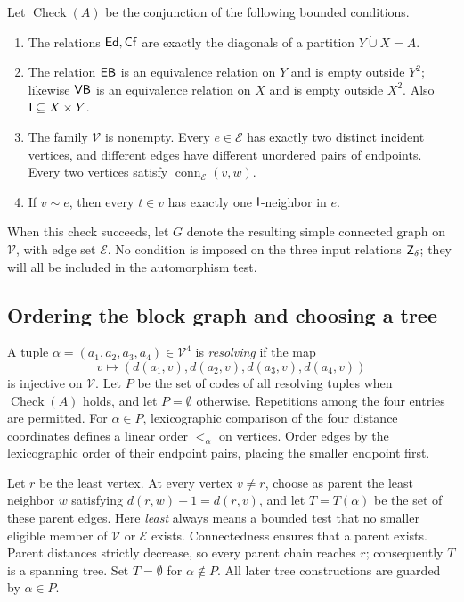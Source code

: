 Let \(\operatorname{Check}(A)\) be the conjunction of the following
bounded conditions.
\begin{enumerate}[label=(\roman*)]
 \item The relations \(\mathsf{Ed},\mathsf{Cf}\) are exactly the diagonals of a
       partition \(Y\mathbin{\dot\cup}X=A\).
 \item The relation \(\mathsf{EB}\) is an equivalence relation on \(Y\) and
       is empty outside \(Y^2\); likewise \(\mathsf{VB}\) is an equivalence
       relation on \(X\) and is empty outside \(X^2\).
       Also \(\mathsf I\subseteq X\times Y\).
 \item The family \(\mathcal V\) is nonempty. Every \(e\in\mathcal E\)
       has exactly two distinct incident vertices, and different
       edges have different unordered pairs of endpoints.
       Every two vertices satisfy
       \(\operatorname{conn}_{\mathcal E}(v,w)\).
 \item If \(v\sim e\), then every \(t\in v\) has exactly one
       \(\mathsf I\)-neighbor in \(e\).
\end{enumerate}
When this check succeeds, let \(G\) denote the resulting simple connected
graph on \(\mathcal V\), with edge set \(\mathcal E\). No condition is
imposed on the three input relations \(\mathsf Z_\delta\); they will all be
included in the automorphism test.

\subsection{Ordering the block graph and choosing a tree}

A tuple \(\alpha=(a_1,a_2,a_3,a_4)\in\mathcal V^4\) is
\emph{resolving} if the map
\[
 v\longmapsto
 (d(a_1,v),d(a_2,v),d(a_3,v),d(a_4,v))
\]
is injective on \(\mathcal V\). Let \(P\) be the set of codes of all
resolving tuples when \(\operatorname{Check}(A)\) holds, and let
\(P=\emptyset\) otherwise. Repetitions among the four entries are
permitted. For \(\alpha\in P\), lexicographic comparison of the four
distance coordinates defines a linear order \(<_\alpha\) on vertices.
Order edges by the lexicographic order of their endpoint pairs, placing
the smaller endpoint first.

Let \(r\) be the least vertex. At every vertex \(v\ne r\), choose as
parent the least neighbor \(w\) satisfying
\(d(r,w)+1=d(r,v)\), and let \(T=T(\alpha)\) be the set of these parent
edges. Here \emph{least} always means a bounded test that no smaller
eligible member of \(\mathcal V\) or \(\mathcal E\) exists. Connectedness
ensures that a parent exists. Parent distances strictly decrease, so
every parent chain reaches \(r\); consequently \(T\) is a spanning tree.
Set \(T=\emptyset\) for \(\alpha\notin P\).
All later tree constructions are guarded by \(\alpha\in P\).

